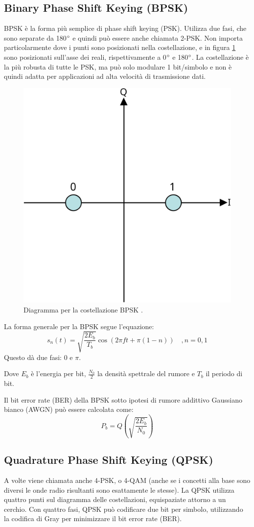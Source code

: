 \subsection{Binary Phase Shift Keying (BPSK)}
\ac{BPSK} è la forma più semplice di phase shift keying (\ac{PSK}).
Utilizza due fasi, che sono separate da 180$\degree$ e quindi può essere anche chiamata 2-\ac{PSK}.
Non importa particolarmente dove i punti sono posizionati nella costellazione, e in figura \ref{fig:bpsk-diagram} sono posizionati sull'asse dei reali, rispettivamente a 0$\degree$ e 180$\degree$.
La costellazione è la più robusta di tutte le \ac{PSK}, ma può solo modulare 1 bit/simbolo e non è quindi adatta per applicazioni ad alta velocità di trasmissione dati.

\begin{figure}[htbp]
  \centering
  \includegraphics[width=0.4\linewidth]{./res/img/bpsk_diagram.png}
  \caption{Diagramma per la costellazione BPSK \cite{wikipedia_phase-shift_nodate}.}
  \label{fig:bpsk-diagram}
\end{figure}

La forma generale per la \ac{BPSK} segue l'equazione:
$$s_n(t) = \sqrt{\frac{2E_b}{T_b}} \cos(2\pi f t + \pi(1-n)) \quad , n = 0,1 $$
Questo dà due fasi: 0 e $\pi$.

Dove $E_b$ è l'energia per bit, $\frac{N_0}{2}$ la densità spettrale del rumore e $T_b$ il periodo di bit.

Il bit error rate (\ac{BER}) della \ac{BPSK} sotto ipotesi di rumore addittivo Gaussiano bianco (\acs{AWGN}) può essere calcolata come:
$$P_b = Q(\sqrt{\frac{2 E_b}{N_0}})$$

\subsection{Quadrature Phase Shift Keying (QPSK)}
A volte viene chiamata anche 4-\ac{PSK}, o 4-\ac{QAM} (anche se i concetti alla base sono diversi le onde radio risultanti sono esattamente le stesse).
La \ac{QPSK} utilizza quattro punti sul diagramma delle costellazioni, equispaziate attorno a un cerchio.
Con quattro fasi, \ac{QPSK} può codificare due bit per simbolo, utilizzando la codifica di Gray per minimizzare il bit error rate (\ac{BER}).

